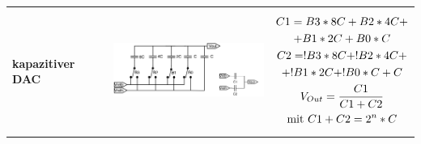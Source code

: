 \begin{longtable}{|l|l|l|}
\begin{minipage}{6cm}
\end{minipage}
\\
\hline

\begin{minipage}{4cm}
\textbf{kapazitiver DAC}
\end{minipage}
&
\begin{minipage}{6cm}
\includegraphics[width=6cm, height = 3.5cm]{pictures/kapazitiverDAC}
\end{minipage}
&
\begin{minipage}{7cm}
\begin{gather}
C1=B3*8C+B2*4C+\notag\\+B1*2C+B0*C\\
C2=!B3*8C+!B2*4C+\notag\\+!B1*2C+!B0*C+C\\
V_{Out}=\frac{C1}{C1+C2}\\
\text{mit } C1+C2=2^n*C
\end{gather}

\end{minipage}
\\
\hline
\end{longtable}


